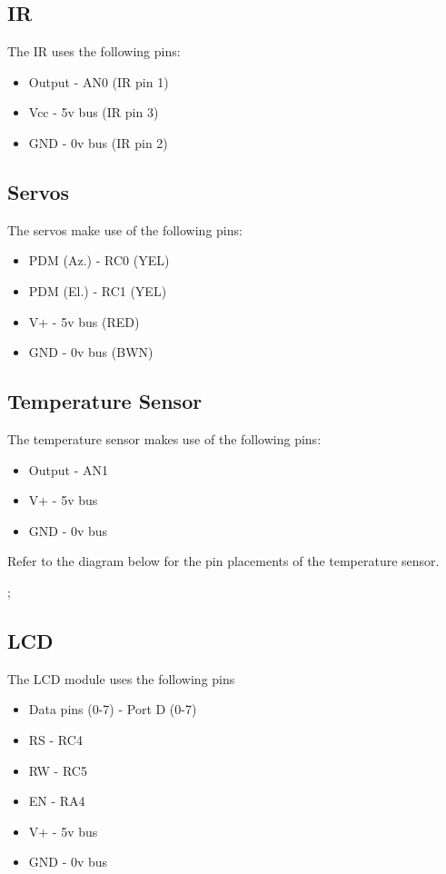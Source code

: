 \documentclass[]{report}
\begin{document}
\subsection{IR}
The IR uses the following pins:
\begin{itemize}
	\item Output - AN0 (IR pin 1)
	\item Vcc - 5v bus (IR pin 3)
	\item GND - 0v bus (IR pin 2)
\end{itemize}

\subsection{Servos}
The servos make use of the following pins:
\begin{itemize}
	\item PDM (Az.) - RC0 (YEL)
	\item PDM (El.) - RC1 (YEL)
	\item V+ - 5v bus (RED)
	\item GND - 0v bus (BWN)
\end{itemize}

\subsection{Temperature Sensor}
The temperature sensor makes use of the following pins:
\begin{itemize}
	\item Output - AN1 
	\item V+ - 5v bus
	\item GND - 0v bus
\end{itemize}
Refer to the diagram below for the pin placements of the temperature sensor.

;
\label{TempSensorPins}


\subsection{LCD}
The LCD module uses the following pins
\begin{itemize}
	\item Data pins (0-7) - Port D (0-7)
	\item RS - RC4
	\item RW - RC5
	\item EN - RA4
	\item V+ - 5v bus
	\item GND - 0v bus
\end{itemize}
\end{document}
